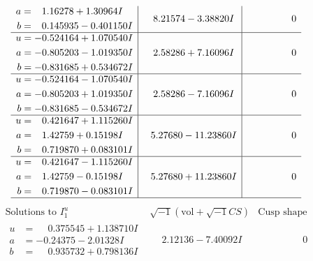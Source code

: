 \documentclass[1p]{elsarticle_modified}
\theoremstyle{definition}
\newcommand{\I}{\sqrt{-1}}
\begin{document}
$$\begin{array}{c|c|c}
\begin{aligned}
a &= \phantom{-}1.16278 + 1.30964 I \\
b &= \phantom{-}0.145935 - 0.401150 I\end{aligned}
 & \phantom{-}8.21574 - 3.38820 I & \phantom{-0.000000 } 0 \\ \hline\begin{aligned}
u &= -0.524164 + 1.070540 I \\
a &= -0.805203 - 1.019350 I \\
b &= -0.831685 + 0.534672 I\end{aligned}
 & \phantom{-}2.58286 + 7.16096 I & \phantom{-0.000000 } 0 \\ \hline\begin{aligned}
u &= -0.524164 - 1.070540 I \\
a &= -0.805203 + 1.019350 I \\
b &= -0.831685 - 0.534672 I\end{aligned}
 & \phantom{-}2.58286 - 7.16096 I & \phantom{-0.000000 } 0 \\ \hline\begin{aligned}
u &= \phantom{-}0.421647 + 1.115260 I \\
a &= \phantom{-}1.42759 + 0.15198 I \\
b &= \phantom{-}0.719870 + 0.083101 I\end{aligned}
 & \phantom{-}5.27680 - 11.23860 I & \phantom{-0.000000 } 0 \\ \hline\begin{aligned}
u &= \phantom{-}0.421647 - 1.115260 I \\
a &= \phantom{-}1.42759 - 0.15198 I \\
b &= \phantom{-}0.719870 - 0.083101 I\end{aligned}
 & \phantom{-}5.27680 + 11.23860 I & \phantom{-0.000000 } 0\\
 \hline 
 \end{array}$$\newpage$$\begin{array}{c|c|c}  
\text{Solutions to }I^u_{1}& \I (\text{vol} + \sqrt{-1}CS) & \text{Cusp shape}\\
 \hline 
\begin{aligned}
u &= \phantom{-}0.375545 + 1.138710 I \\
a &= -0.24375 - 2.01328 I \\
b &= \phantom{-}0.935732 + 0.798136 I\end{aligned}
 & \phantom{-}2.12136 - 7.40092 I & \phantom{-0.000000 } 0 \\ \hline\begin{aligned}

\end{aligned}
\end{array}$$
\end{document}
